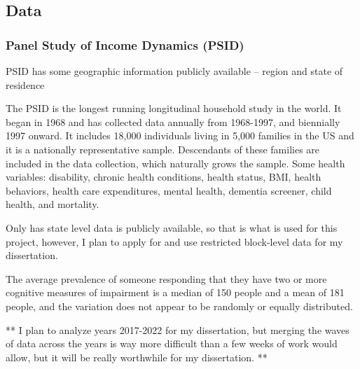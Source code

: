 \documentclass[
]{article}
\begin{document}
\hypertarget{data}{%
\subsection{Data}\label{data}}

\hypertarget{panel-study-of-income-dynamics-psid}{%
\subsubsection{Panel Study of Income Dynamics
(PSID)}\label{panel-study-of-income-dynamics-psid}}

PSID has some geographic information publicly available -- region and
state of residence

The PSID is the longest running longitudinal household study in the
world. It began in 1968 and has collected data annually from 1968-1997,
and biennially 1997 onward. It includes 18,000 individuals living in
5,000 families in the US and it is a nationally representative sample.
Descendants of these families are included in the data collection, which
naturally grows the sample. Some health variables: disability, chronic
health conditions, health status, BMI, health behaviors, health care
expenditures, mental health, dementia screener, child health, and
mortality.

Only has state level data is publicly available, so that is what is used
for this project, however, I plan to apply for and use restricted
block-level data for my dissertation.

The average prevalence of someone responding that they have two or more
cognitive measures of impairment is a median of 150 people and a mean of
181 people, and the variation does not appear to be randomly or equally
distributed.

** I plan to analyze years 2017-2022 for my dissertation, but merging
the waves of data across the years is way more difficult than a few
weeks of work would allow, but it will be really worthwhile for my
dissertation. **
\end{document}
